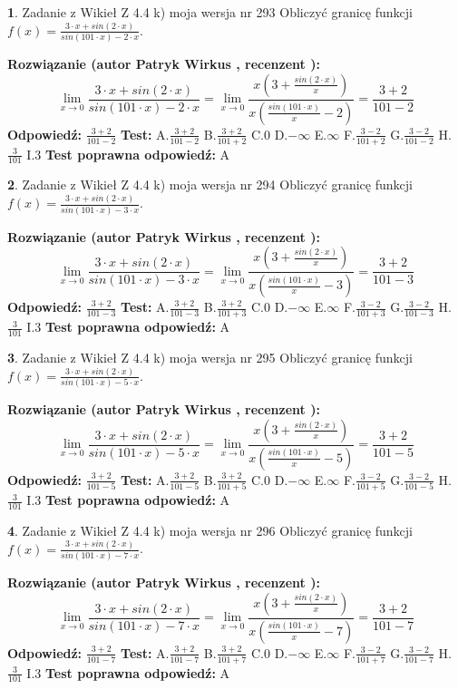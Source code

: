 \documentclass[12pt, a4paper]{article}
\theoremstyle{definition} %
\newtheorem{zad}{}
\newcommand{\zadStart}[1]{\begin{zad}#1\newline}
\newcommand{\zadStop}{\end{zad}}
\newcommand{\rozwStart}[2]{\noindent \textbf{Rozwiązanie (autor #1 , recenzent #2): }\newline}
\newcommand{\rozwStop}{\newline}
\newcommand{\odpStart}{\noindent \textbf{Odpowiedź:}\newline}
\newcommand{\odpStop}{\newline}
\newcommand{\testStart}{\noindent \textbf{Test:}\newline}
\newcommand{\testStop}{\newline}
\newcommand{\kluczStart}{\noindent \textbf{Test poprawna odpowiedź:}\newline}
\newcommand{\kluczStop}{\newline}
\begin{document}
\zadStart{Zadanie z Wikieł Z 4.4 k) moja wersja nr 293}
Obliczyć granicę funkcji $f(x)=\frac{3\cdot x +sin(2\cdot x)}{sin(101\cdot x) -2\cdot x}$.
\zadStop
\rozwStart{Patryk Wirkus}{}
$$\lim\limits_{x\to 0}\frac{3\cdot x +sin(2\cdot x)}{sin(101\cdot x) -2\cdot x}
=\lim\limits_{x\to 0}\frac{x(3+\frac{sin(2\cdot x)}{x})}{x(\frac{sin(101\cdot x)}{x}-2)}
=\frac{3+2}{101-2}$$
\rozwStop
\odpStart
$\frac{3+2}{101-2}$
\odpStop
\testStart
A.$\frac{3+2}{101-2}$
B.$\frac{3+2}{101+2}$
C.$0$
D.$-\infty$
E.$\infty$
F.$\frac{3-2}{101+2}$
G.$\frac{3-2}{101-2}$
H.$\frac{3}{101}$
I.$3$
\testStop
\kluczStart
A
\kluczStop



\zadStart{Zadanie z Wikieł Z 4.4 k) moja wersja nr 294}
Obliczyć granicę funkcji $f(x)=\frac{3\cdot x +sin(2\cdot x)}{sin(101\cdot x) -3\cdot x}$.
\zadStop
\rozwStart{Patryk Wirkus}{}
$$\lim\limits_{x\to 0}\frac{3\cdot x +sin(2\cdot x)}{sin(101\cdot x) -3\cdot x}
=\lim\limits_{x\to 0}\frac{x(3+\frac{sin(2\cdot x)}{x})}{x(\frac{sin(101\cdot x)}{x}-3)}
=\frac{3+2}{101-3}$$
\rozwStop
\odpStart
$\frac{3+2}{101-3}$
\odpStop
\testStart
A.$\frac{3+2}{101-3}$
B.$\frac{3+2}{101+3}$
C.$0$
D.$-\infty$
E.$\infty$
F.$\frac{3-2}{101+3}$
G.$\frac{3-2}{101-3}$
H.$\frac{3}{101}$
I.$3$
\testStop
\kluczStart
A
\kluczStop



\zadStart{Zadanie z Wikieł Z 4.4 k) moja wersja nr 295}
Obliczyć granicę funkcji $f(x)=\frac{3\cdot x +sin(2\cdot x)}{sin(101\cdot x) -5\cdot x}$.
\zadStop
\rozwStart{Patryk Wirkus}{}
$$\lim\limits_{x\to 0}\frac{3\cdot x +sin(2\cdot x)}{sin(101\cdot x) -5\cdot x}
=\lim\limits_{x\to 0}\frac{x(3+\frac{sin(2\cdot x)}{x})}{x(\frac{sin(101\cdot x)}{x}-5)}
=\frac{3+2}{101-5}$$
\rozwStop
\odpStart
$\frac{3+2}{101-5}$
\odpStop
\testStart
A.$\frac{3+2}{101-5}$
B.$\frac{3+2}{101+5}$
C.$0$
D.$-\infty$
E.$\infty$
F.$\frac{3-2}{101+5}$
G.$\frac{3-2}{101-5}$
H.$\frac{3}{101}$
I.$3$
\testStop
\kluczStart
A
\kluczStop



\zadStart{Zadanie z Wikieł Z 4.4 k) moja wersja nr 296}
Obliczyć granicę funkcji $f(x)=\frac{3\cdot x +sin(2\cdot x)}{sin(101\cdot x) -7\cdot x}$.
\zadStop
\rozwStart{Patryk Wirkus}{}
$$\lim\limits_{x\to 0}\frac{3\cdot x +sin(2\cdot x)}{sin(101\cdot x) -7\cdot x}
=\lim\limits_{x\to 0}\frac{x(3+\frac{sin(2\cdot x)}{x})}{x(\frac{sin(101\cdot x)}{x}-7)}
=\frac{3+2}{101-7}$$
\rozwStop
\odpStart
$\frac{3+2}{101-7}$
\odpStop
\testStart
A.$\frac{3+2}{101-7}$
B.$\frac{3+2}{101+7}$
C.$0$
D.$-\infty$
E.$\infty$
F.$\frac{3-2}{101+7}$
G.$\frac{3-2}{101-7}$
H.$\frac{3}{101}$
I.$3$
\testStop
\kluczStart
A
\kluczStop
\end{document}
